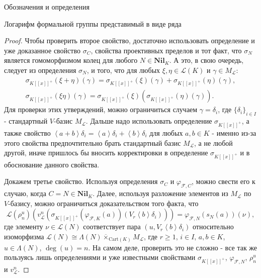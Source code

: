 \documentclass[a4paper,14pt]{extarticle}
\theoremstyle{definition}
\newcommand{\Cart}{\mathrm{Cart}}
\newcommand{\Nil}[1]{\mathbf{Nil}_{#1}}
\newcommand{\oH}[1]{\left\langle #1 \right\rangle}
\newcommand{\sF}{\mathscr{F}}
\newcommand{\sL}{\mathscr{L}}
\begin{document}
\begin{section}{Обозначения и определения}
\begin{subsection}{Логарифм формальной группы представимый в виде ряда}
\begin{proof}
    Чтобы проверить второе свойство, достаточно использовать определение и уже доказанное свойство $\sigma_C$, свойства проективных пределов и тот факт, что $\sigma_N$ является гомоморфизмом колец для любого ${ N \in \Nil{K} }$. А это, в свою очередь, следует из определения $\sigma_N$, и того, что для любых ${ \xi, \eta \in \sL(K) }$ и ${ \gamma \in M_\sL }$:
    \begin{gather*}
        \sigma_{K[[x]]^+}(\xi + \eta)(\gamma) =
        \sigma_{K[[x]]^+}(\xi)(\gamma) +
        \sigma_{K[[x]]^+}(\eta)(\gamma), \\
        \sigma_{K[[x]]^+}(\xi \eta)(\gamma) =
        \sigma_{K[[x]]^+}(\xi)\left(
            \sigma_{K[[x]]^+}(\eta)(\gamma)
        \right).
    \end{gather*}
    Для проверки этих утверждений, можно ограничиться случаем ${ \gamma = \delta_i }$, где ${ \{ \delta_i \}_{i \in I} }$ - стандартный $V$-базис $M_\sL$. Дальше надо использовать определение $\sigma_{K[[x]]^+}$, а также свойство ${ \oH{a + b} \delta_i = \oH{a} \delta_i + \oH{b} \delta_i }$ для любых ${ a, b \in K }$ - именно из-за этого свойства предпочтительно брать стандартный базис $M_\sL$, а не любой другой, иначе пришлось бы вносить корректировки в определение $\sigma_{K[[x]]^+}$ и в обоснование данного свойства.

    Докажем третье свойство. Используя определения $\sigma_C$ и $\varphi_{\sF, C}$, можно свести его к случаю, когда ${ C = N \in \Nil{K} }$. Далее, используя разложение элементов из $M_\sL$ по $V$-базису, можно ограничиться доказательством того факта, что
    \begin{equation*}
        \sL(\rho^u_n)\left(
            v_\sL^n\left(
                \sigma_{K[[x]]^+}\left(
                    \varphi_{\sF, K}(a)
                \right)(V_r \oH{b} \delta_i)
            \right)
        \right) =
        \varphi_{\sF, N}(s_N(a))(\nu),
    \end{equation*}
    где элементу ${ \nu \in \sL(N) }$ соответствует пара ${ (u, V_r \oH{b} \delta_i) }$ относительно изоморфизма ${ \sL(N) \cong \Lambda(N) \overline{\times}_{\Cart(K)} M_\sL }$, где ${ r \geq 1 }$, ${ i \in I }$, ${ a, b \in K }$, ${ u \in \Lambda(N) }$, ${ \deg(u) = n }$. На самом деле, проверить это не сложно - все так же пользуясь лишь определениями и уже известными свойствами $\sigma_{K[[x]]^+}$, $\varphi_{\sF, N}$, $\rho^u_n$ и $v_\sL^n$.
\end{proof}


\end{subsection}
\end{section}
\end{document}
